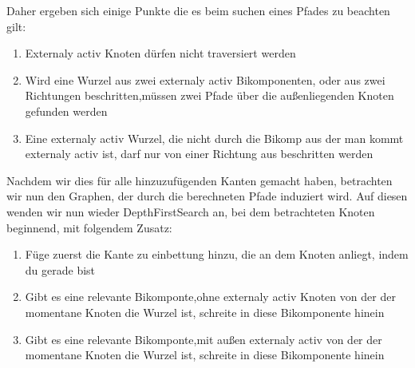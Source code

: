 \documentclass[runningheads]{llncs}
\begin{document}
    Daher ergeben sich einige Punkte die es beim suchen eines Pfades zu beachten gilt:
    \begin{enumerate}
        \item Externaly activ Knoten dürfen nicht traversiert werden
        \item Wird eine Wurzel aus zwei externaly activ Bikomponenten, oder aus zwei Richtungen beschritten,müssen zwei Pfade über die außenliegenden Knoten gefunden werden
        \item Eine externaly activ Wurzel, die nicht durch die Bikomp aus der man kommt externaly activ ist, darf nur von einer Richtung aus beschritten werden
    \end{enumerate}

    Nachdem wir dies für alle hinzuzufügenden Kanten gemacht haben, betrachten wir nun den Graphen, der durch die berechneten Pfade induziert wird. Auf diesen wenden wir nun wieder DepthFirstSearch an, bei dem betrachteten Knoten beginnend, mit folgendem Zusatz:
    \begin{enumerate}
        \item Füge zuerst die Kante zu einbettung hinzu, die an dem Knoten anliegt, indem du gerade bist
        \item Gibt es eine relevante Bikomponte,ohne externaly activ Knoten von der der momentane Knoten die Wurzel ist, schreite in diese Bikomponente hinein
        \item Gibt es eine relevante Bikomponte,mit außen externaly activ von der der momentane Knoten die Wurzel ist, schreite in diese Bikomponente hinein

    \end{enumerate}
\end{document}
